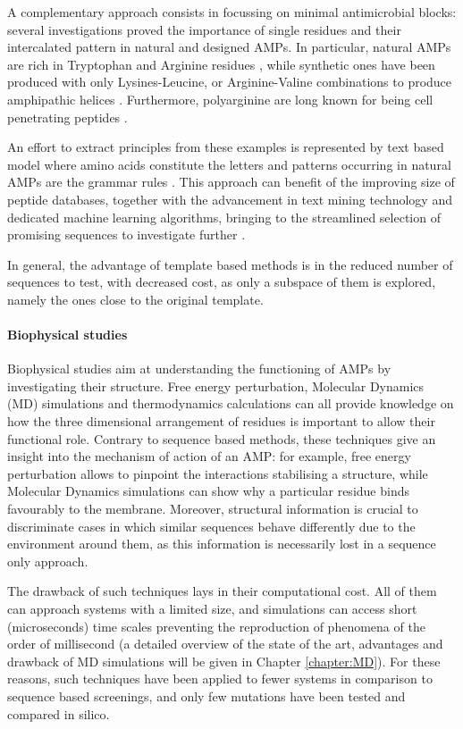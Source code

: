 A complementary approach consists in focussing on minimal antimicrobial blocks: several investigations proved the importance of single residues and their intercalated pattern in natural and designed AMPs. In particular, natural AMPs are rich in Tryptophan and Arginine residues \cite{Chan2006}, while synthetic ones have been produced with only Lysines-Leucine, or Arginine-Valine combinations to produce amphi­pathic helices \cite{Deslouches2005}. Furthermore, polyarginine are long known for being cell penetrating peptides \cite{Schmidt2010}.

An effort to extract principles from these examples is represented by text based model where amino acids constitute the letters and patterns occurring in natural AMPs are the grammar rules \cite{Loose2006}.
This approach can benefit of the improving size of peptide databases, together with the advancement in text mining technology and dedicated machine learning algorithms, bringing to the streamlined selection of promising sequences to investigate further \cite{Cipcigan2018}.

In general, the advantage of template based methods is in the reduced number of sequences to test, with decreased cost, as only a subspace of them is explored, namely the ones close to the original template.


\paragraph{Biophysical studies}
Biophysical studies aim at understanding the functioning of AMPs by investigating their structure. Free energy perturbation, Molecular Dynamics (MD) simulations and thermodynamics calculations can all provide knowledge on how the three dimensional arrangement of residues is important to allow their functional role.
%
Contrary to sequence based methods, these techniques give an insight into the mechanism of action of an AMP: for example, free energy perturbation allows to pinpoint the interactions stabilising a structure, while Molecular Dynamics simulations can show why a particular residue binds favourably to the membrane. Moreover, structural information is crucial to discriminate cases in which similar sequences behave differently due to the environment around them, as this information is necessarily lost in a sequence only approach.

The drawback of such techniques lays in their computational cost. All of them can approach systems with a limited size, and simulations can access short (microseconds) time scales preventing the reproduction of phenomena of the order of millisecond (a detailed overview of the state of the art, advantages and drawback of MD simulations will be given in Chapter \ref{chapter:MD}).
%
For these reasons, such techniques have been applied to fewer systems in comparison to sequence based screenings, and only few mutations have been tested and compared in silico.

